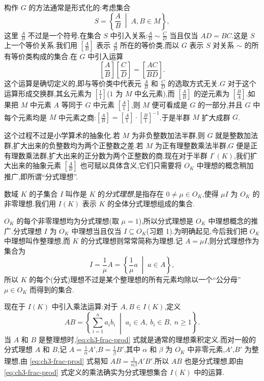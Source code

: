 构作 $G$ 的方法通常是形式化的:考虑集合
\[
  S=\left\{\frac{A}{B}\;\middle|\;A,B\in M\right\},
\]
这里 $\frac{A}{B}$ 不过是一个符号.在集合 $S$ 中引入关系:$\frac{A}{B}\sim\frac{C}{D}$ 当且仅当 $AD=BC$.这是 $S$ 上一个等价关系.我们用 $\left[\frac{A}{B}\right]$ 表示 $\frac{A}{B}$ 所在的等价类,而以 $G$ 表示 $S$ 对关系 $\sim$ 的所有等价类构成的集合.在 $G$ 中引入运算
\[
  \left[\frac{A}{B}\right]\left[\frac{C}{D}\right]=\left[\frac{AC}{BD}\right].
\]
这个运算是确切定义的,即与等价类中代表元 $\frac{A}{B}$ 和 $\frac{C}{D}$ 的选取方式无关.$G$ 对于这个运算形成交换群,其幺元素为 $\left[\frac{1}{1}\right]$($1$ 为 $M$ 中幺元素),而 $\left[\frac{A}{B}\right]$ 的逆元素为 $\left[\frac{B}{A}\right]$.如果把 $M$ 中元素 $A$ 等同于 $G$ 中元素 $\left[\frac{A}{1}\right]$,则 $M$ 便可看成是 $G$ 的一部分,并且 $G$ 中每个元素均是 $M$ 中元素之商:$\left[\frac{A}{B}\right]=\left[\frac{A}{1}\right]\cdot\left[\frac{B}{1}\right]^{-1}$.于是半群 $M$ 扩大成群 $G$.

\begin{sloppypar}
这个过程不过是小学算术的抽象化.若 $M$ 为非负整数加法半群,则 $G$ 就是整数加法群,扩大出来的负整数均为两个正整数之差.若 $M$ 为正有理整数乘法半群,$G$ 便是正有理数乘法群,扩大出来的正分数为两个正整数的商.现在对于半群 $I^{\circ}(K)$,我们扩大出来的抽象元素 $\left[\frac{A}{B}\right]$ 也可赋以具体含义,它们只需要将 $O_K$ 中理想的概念稍加推广,即所谓``分式理想''.
\end{sloppypar}

\begin{definition}\label{def:ch3-4}
数域 $K$ 的子集合 $I$ 叫作是 $K$ 的\emph{分式理想},是指存在 $0\neq\mu\in O_K$,使得 $\mu I$ 为 $O_K$ 的非零理想.我们用 $I(K)$ 表示 $K$ 的全体分式理想组成的集合.
\end{definition}

\begin{sloppypar}
$O_K$ 的每个非零理想均为分式理想(取 $\mu=1$),所以分式理想是 $O_K$ 中理想概念的推广.分式理想 $I$ 为 $O_K$ 中理想当且仅当 $I\subseteq O_K$(习题 1).为明确起见,今后我们把 $O_K$ 中理想叫作整理想,而 $K$ 的分式理想则常常简称为理想.记 $A=\mu I$,则分式理想作为集合为
\[
  I=\frac{1}{\mu}A=\left\{\frac{1}{\mu}a\;\middle|\;a\in A\right\},
\]
所以 $K$ 的每个(分式)理想不过是某个整理想的所有元素均除以一个``公分母'' $\mu\in O_K$ 而得到的集合.
\end{sloppypar}

现在于 $I(K)$ 中引入乘法运算:对于 $A,B\in I(K)$,定义
\begin{equation}\label{eq:ch3-frac-prod}
  AB=\left\{\sum_{i=1}^{n}a_ib_i\;\middle|\;a_i\in A,\ b_i\in B,\ n\geqslant 1\right\}.
\end{equation}
当 $A$ 和 $B$ 是整理想时,\eqref{eq:ch3-frac-prod} 式就是通常的理想乘积定义.而对一般的分式理想 $A$ 和 $B$,记 $A=\frac{1}{\alpha}A'$,$B=\frac{1}{\beta}B'$,其中 $\alpha$ 和 $\beta$ 为 $O_K$ 中非零元素,$A'$,$B'$ 为整理想,由 \eqref{eq:ch3-frac-prod} 式易知 $AB=\frac{1}{\alpha\beta}A'B'$.所以 $AB$ 也是分式理想,即由 \eqref{eq:ch3-frac-prod} 式定义的乘法确实为分式理想集合 $I(K)$ 中的运算.

